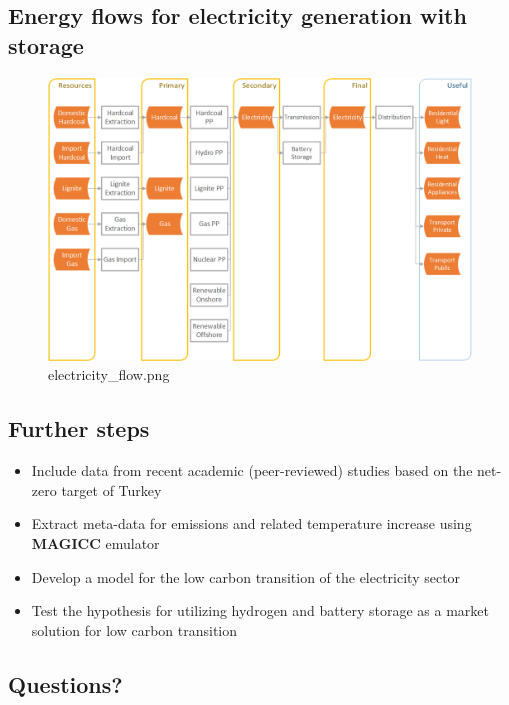 \documentclass[11pt]{article}
\providecommand{\tightlist}{%
      \setlength{\itemsep}{0pt}\setlength{\parskip}{0pt}}
\begin{document}
    \hypertarget{energy-flows-for-electricity-generation-with-storage}{%
\subsection{Energy flows for electricity generation with
storage}\label{energy-flows-for-electricity-generation-with-storage}}

\begin{figure}
\centering
\includegraphics{electricity_flow.png}
\caption{electricity\_flow.png}
\end{figure}

    \hypertarget{further-steps}{%
\subsection{Further steps}\label{further-steps}}

\begin{itemize}
\tightlist
\item
  Include data from recent academic (peer-reviewed) studies based on the
  net-zero target of Turkey
\item
  Extract meta-data for emissions and related temperature increase using
  \textbf{MAGICC} emulator
\item
  Develop a model for the low carbon transition of the electricity
  sector
\item
  Test the hypothesis for utilizing hydrogen and battery storage as a
  market solution for low carbon transition
\end{itemize}

    \hypertarget{questions}{%
\subsection{Questions?}\label{questions}}
\end{document}
